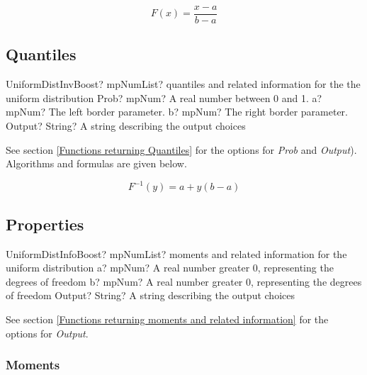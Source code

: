 \begin{equation} 
	F(x)=\frac{x-a}{b-a}
\end{equation}



\subsection{Quantiles}

\begin{mpFunctionsExtract}
	\mpFunctionFourNotImplemented
	{UniformDistInvBoost? mpNumList? quantiles and related information for the the uniform distribution}
	{Prob? mpNum? A real number between 0 and 1.}
	{a? mpNum? The left border parameter.}
	{b? mpNum? The right border parameter.}
	{Output? String? A string describing the output choices}
\end{mpFunctionsExtract}


\vspace{0.3cm}
See section \ref{Functions returning Quantiles} for the options for  {\itshape\sffamily Prob} and {\itshape\sffamily Output}). Algorithms and formulas are given below.

\begin{equation} 
	F^{-1}(y)= a+y(b-a)
\end{equation}



\subsection{Properties}
\label{UniformDistributionProperties}

\begin{mpFunctionsExtract}
	\mpFunctionThreeNotImplemented
	{UniformDistInfoBoost? mpNumList? moments and related information for the uniform distribution}
	{a? mpNum? A real number greater 0, representing the degrees of freedom}
	{b? mpNum? A real number greater 0, representing the degrees of freedom}
	{Output? String? A string describing the output choices}
\end{mpFunctionsExtract}

\vspace{0.3cm}

See section \ref{Functions returning moments and related information} for the options for {\itshape\sffamily Output}. 


\subsubsection{Moments}

